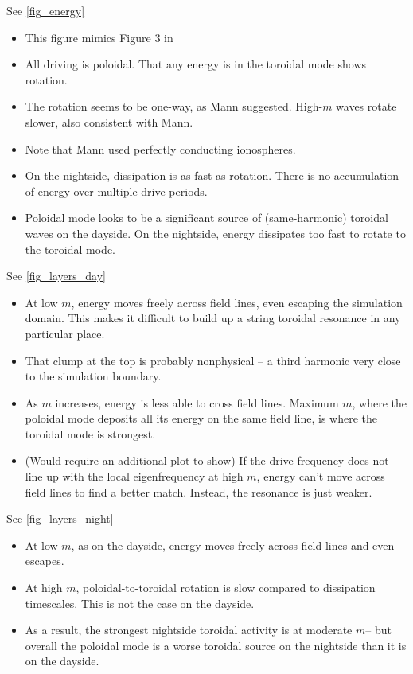 \documentclass{article}
\newcommand{\azm}{\ensuremath{m}\xspace}
\begin{document}
See \cref{fig_energy}

\begin{itemize}
    \item This figure mimics Figure 3 in \cite{mann_1995}
    \item All driving is poloidal. That any energy is in the toroidal mode shows rotation. 
    \item The rotation seems to be one-way, as Mann suggested. High-\azm waves rotate slower, also consistent with Mann. 
    \item Note that Mann used perfectly conducting ionospheres. 
    \item On the nightside, dissipation is as fast as rotation. There is no accumulation of energy over multiple drive periods. 
    \item Poloidal mode looks to be a significant source of (same-harmonic) toroidal waves on the dayside. On the nightside, energy dissipates too fast to rotate to the toroidal mode. 
\end{itemize}

See \cref{fig_layers_day}

\begin{itemize}
    \item At low \azm, energy moves freely across field lines, even escaping the simulation domain. This makes it difficult to build up a string toroidal resonance in any particular place.
    \item That clump at the top is probably nonphysical -- a third harmonic very close to the simulation boundary. 
    \item As \azm increases, energy is less able to cross field lines. Maximum \azm, where the poloidal mode deposits all its energy on the same field line, is where the toroidal mode is strongest. 
    \item (Would require an additional plot to show) If the drive frequency does not line up with the local eigenfrequency at high \azm, energy can't move across field lines to find a better match. Instead, the resonance is just weaker. 
\end{itemize}

See \cref{fig_layers_night}

\begin{itemize}
    \item At low \azm, as on the dayside, energy moves freely across field lines and even escapes. 
    \item At high \azm, poloidal-to-toroidal rotation is slow compared to dissipation timescales. This is not the case on the dayside. 
    \item As a result, the strongest nightside toroidal activity is at moderate \azm -- but overall the poloidal mode is a worse toroidal source on the nightside than it is on the dayside. 
\end{itemize}
\end{document}
